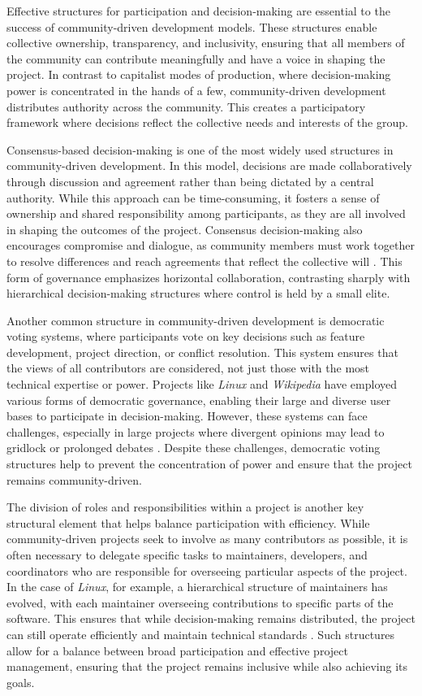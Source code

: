 \begin{refsection}
Effective structures for participation and decision-making are essential to the success of community-driven development models. These structures enable collective ownership, transparency, and inclusivity, ensuring that all members of the community can contribute meaningfully and have a voice in shaping the project. In contrast to capitalist modes of production, where decision-making power is concentrated in the hands of a few, community-driven development distributes authority across the community. This creates a participatory framework where decisions reflect the collective needs and interests of the group.

Consensus-based decision-making is one of the most widely used structures in community-driven development. In this model, decisions are made collaboratively through discussion and agreement rather than being dictated by a central authority. While this approach can be time-consuming, it fosters a sense of ownership and shared responsibility among participants, as they are all involved in shaping the outcomes of the project. Consensus decision-making also encourages compromise and dialogue, as community members must work together to resolve differences and reach agreements that reflect the collective will \cite[pp.~68-71]{kelty2008}. This form of governance emphasizes horizontal collaboration, contrasting sharply with hierarchical decision-making structures where control is held by a small elite.

Another common structure in community-driven development is democratic voting systems, where participants vote on key decisions such as feature development, project direction, or conflict resolution. This system ensures that the views of all contributors are considered, not just those with the most technical expertise or power. Projects like \textit{Linux} and \textit{Wikipedia} have employed various forms of democratic governance, enabling their large and diverse user bases to participate in decision-making. However, these systems can face challenges, especially in large projects where divergent opinions may lead to gridlock or prolonged debates \cite[pp.~154-157]{schweik2018}. Despite these challenges, democratic voting structures help to prevent the concentration of power and ensure that the project remains community-driven.

The division of roles and responsibilities within a project is another key structural element that helps balance participation with efficiency. While community-driven projects seek to involve as many contributors as possible, it is often necessary to delegate specific tasks to maintainers, developers, and coordinators who are responsible for overseeing particular aspects of the project. In the case of \textit{Linux}, for example, a hierarchical structure of maintainers has evolved, with each maintainer overseeing contributions to specific parts of the software. This ensures that while decision-making remains distributed, the project can still operate efficiently and maintain technical standards \cite[pp.~59-61]{raymond2022}. Such structures allow for a balance between broad participation and effective project management, ensuring that the project remains inclusive while also achieving its goals.


\end{refsection}
